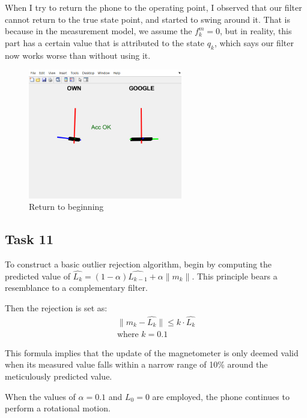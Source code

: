 When I try to return the phone to the operating point, I observed that our filter cannot return to the true state point, and started to swing around it. That is because in the measurement model, we assume the $ f^m_k =0 $, but in reality, this part has a certain value that is attributed to the state $ q_k $, which says our filter now works worse than without using it.

\begin{figure}[H]
 \centering
 \includegraphics[width=0.6\textwidth]{images/returnmag.png}
 \caption{Return to beginning}
 \label{return}
\end{figure}



\subsection{Task 11}

To construct a basic outlier rejection algorithm, begin by computing the predicted value of $ \hat{L_k} = (1-\alpha)\hat{L_{k-1}}+\alpha \lVert m_k\rVert $. This principle bears a resemblance to a complementary filter.

Then the rejection is set as:
\begin{equation}
    \begin{aligned}
        \lVert m_k - \hat{L_k}\rVert \leq k \cdot \hat{L_k}\nonumber\\
        \text{where  } k = 0.1    
    \end{aligned}
\end{equation}


This formula implies that the update of the magnetometer is only deemed valid when its measured value falls within a narrow range of 10\% around the meticulously predicted value.

When the values of $ \alpha = 0.1 $ and $ L_0 = 0 $ are employed, the phone continues to perform a rotational motion.

